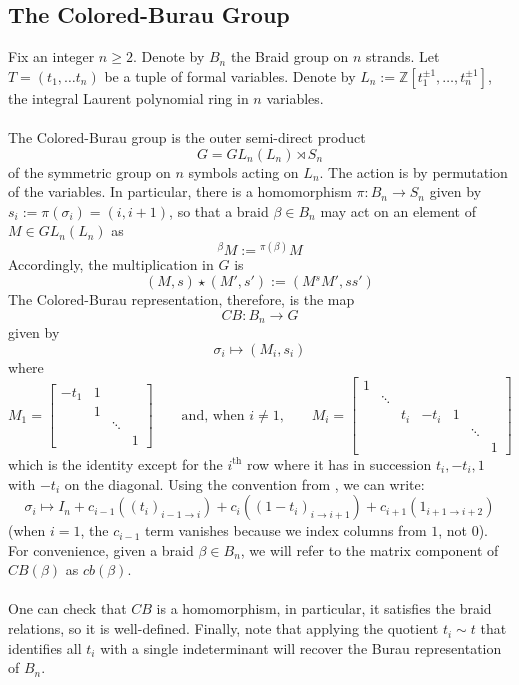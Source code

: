 \documentclass[11pt]{article}
\begin{document}
\subsection{The Colored-Burau Group}
Fix an integer $n\geq 2$. Denote by $B_n$ the Braid group on $n$ strands.
Let $T=(t_1,\hdots t_n)$ be a tuple of formal variables. Denote by
$L_n:=\mathbb{Z}[t_1^{\pm 1},\hdots, t_n^{\pm 1}]$, the integral Laurent polynomial ring in $n$ 
variables. 
\\
\\
The Colored-Burau group is the outer semi-direct product 
$$G=GL_n(L_n)\rtimes S_n$$
of the symmetric group on $n$ symbols acting on $L_n$. The action is by permutation of 
the variables. In particular, there is a homomorphism $\pi:B_n\to S_n$ given by 
$s_i:=\pi(\sigma_i)=(i,i+1)$, so that a braid $\beta\in B_n$ may act on an element of $M\in GL_n(L_n)$ as
$${}^{\beta}M:={}^{\pi(\beta)}M$$
Accordingly, the multiplication in $G$ is
$$(M,s)\star (M',s'):=(M{}^sM',ss')$$
The Colored-Burau representation, therefore, is the map
$$CB:B_n\to G$$
given by 
$$\sigma_i\mapsto (M_i,s_i)$$
where
$$M_1=\begin{bmatrix}
-t_1 & 1 & &\\
& 1 & & \\
& & \ddots &\\
& & & 1
\end{bmatrix} 
\qquad \text{and, when $i\neq 1$,} \qquad 
M_i=
\begin{bmatrix}
1 & & &\\
& \ddots & \\
& & t_i& -t_i & 1 & &\\
& & & & & \ddots &\\
& & & & & & 1
\end{bmatrix}$$
which is the identity except for the $i^{\text{th}}$ row where it has in succession 
$t_i, -t_i, 1$ with $-t_i$ on the diagonal. Using the convention from 
, we can write:
$$\sigma_i \mapsto I_n+c_{i-1}((t_i)_{i-1\to i})+c_i((1-t_i)_{i\to i+1})+c_{i+1}(1_{i+1\to i+2})$$
(when $i=1$, the $c_{i-1}$ term vanishes because we index columns from $1$, not $0$). For convenience, given a braid $\beta\in B_n$, we will refer to the matrix component of $CB(\beta)$ as $cb(\beta)$.
\\
\\
One can check that $CB$ is a homomorphism, in particular, it satisfies the braid relations, so it is well-defined. Finally, note that applying the quotient $t_i\sim t$ that identifies all $t_i$ with a single indeterminant will recover the Burau representation of $B_n$.
\end{document}
